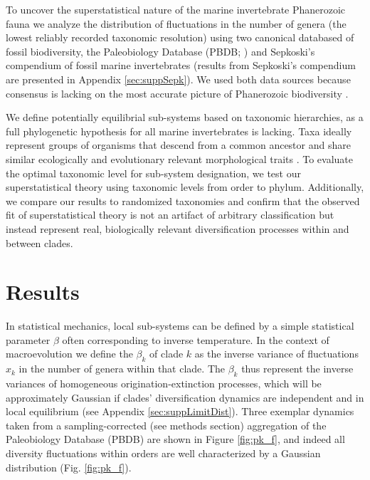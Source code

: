 \documentclass[12pt]{article}
\let\citep=\cite
\begin{document}
To uncover the superstatistical nature of the marine invertebrate
Phanerozoic fauna we analyze the distribution of fluctuations in the
number of genera (the lowest reliably recorded taxonomic resolution)
using two canonical databased of fossil biodiversity, the Paleobiology
Database (PBDB; \citep{alroy08}) and Sepkoski's compendium
\citep{sepkoski1992} of fossil marine invertebrates (results from
Sepkoski's compendium are presented in Appendix
\ref{sec:suppSepk}). We used both data sources because consensus is
lacking on the most accurate picture of Phanerozoic biodiversity
\citep{marshall2010}.

We define potentially equilibrial sub-systems based on taxonomic
hierarchies, as a full phylogenetic hypothesis for all marine
invertebrates is lacking.  Taxa ideally represent groups of organisms
that descend from a common ancestor and share similar ecologically and
evolutionary relevant morphological traits \citep{mayr1965systZool,
  erwin2007}. To evaluate the optimal taxonomic level for sub-system
designation, we test our superstatistical theory using taxonomic
levels from order to phylum. Additionally, we compare our results to
randomized taxonomies and confirm that the observed fit of
superstatistical theory is not an artifact of arbitrary classification
but instead represent real, biologically relevant diversification
processes within and between clades.

\section*{Results}

In statistical mechanics, local sub-systems can be defined by a simple
statistical parameter $\beta$ often corresponding to inverse
temperature. In the context of macroevolution we define the $\beta_k$
of clade $k$ as the inverse variance of fluctuations $x_k$ in the
number of genera within that clade.  The $\beta_k$ thus represent the
inverse variances of homogeneous origination-extinction processes,
which will be approximately Gaussian if clades' diversification
dynamics are independent and in local equilibrium (see Appendix
\ref{sec:suppLimitDist}).  Three exemplar dynamics taken from a
sampling-corrected (see methods section) aggregation of the Paleobiology
Database (PBDB) \citep{alroy08} are shown in Figure \ref{fig:pk_f},
and indeed all diversity fluctuations within orders are well
characterized by a Gaussian distribution (Fig. \ref{fig:pk_f}).
\end{document}

